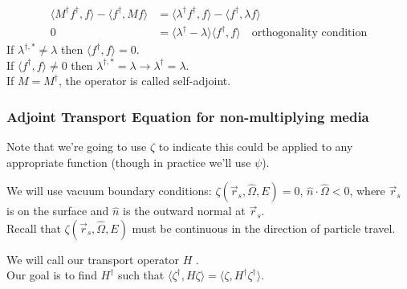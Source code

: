 \documentclass[12pt]{article}
\newcommand{\vOmega}{\ensuremath{\hat{\Omega}}}
\begin{document}
\begin{align*}
\langle M^{\dagger}f^{\dagger}, f\rangle - \langle f^{\dagger}, Mf\rangle &= \langle\lambda^{\dagger} f^{\dagger}, f\rangle - \langle f^{\dagger} ,\lambda f\rangle \\
0 &= \langle\lambda^{\dagger} - \lambda\rangle \langle f^{\dagger}, f\rangle \quad \text{orthogonality condition}
\end{align*}
%
If $\lambda^{\dagger, *} \neq \lambda$ then $\langle f^{\dagger}, f\rangle = 0$.\\
If $\langle f^{\dagger}, f\rangle \neq 0$ then $\lambda^{\dagger, *} = \lambda \rightarrow \lambda^{\dagger} = \lambda$.\\
If $M = M^{\dagger}$, the operator is called self-adjoint. 

\subsubsection*{Adjoint Transport Equation for non-multiplying media}

Note that we're going to use $\zeta$ to indicate this could be applied to any appropriate function (though in practice we'll use $\psi$).

We will use vacuum boundary conditions: $\zeta(\vec{r}_s, \vOmega, E) = 0$, $\hat{n} \cdot \vOmega < 0$, where $\vec{r}_s$ is on the surface and $\hat{n}$ is the outward normal at $\vec{r}_s$.\\
Recall that $\zeta(\vec{r}_s, \vOmega, E)$ must be continuous in the direction of particle travel.


We will call our transport operator $H$ .\\
Our goal is to find $H^{\dagger}$ such that $\langle\zeta^{\dagger}, H \zeta\rangle = \langle\zeta, H^{\dagger} \zeta^{\dagger}\rangle$.\\
\end{document}
